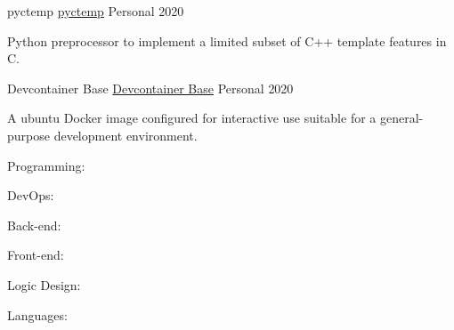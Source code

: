 \documentclass[11pt, a4paper]{cv}
\begin{document}
\begin{cv}
\begin{projects}
\begin{cventries}
{{pyctemp}
{\color{hrefblue}\href{https://github.com/brandonmosher/pyctemp}{pyctemp}}}
{}
{Personal}
{2020}
{\begin{cvparagraph}
Python preprocessor to implement a limited subset of C++ template features in C.
\end{cvparagraph}}
\cventrycompact
{
{Devcontainer Base}
{\color{hrefblue}\href{https://github.com/brandonmosher/devcontainer-base}{Devcontainer Base}}}
{}
{Personal}
{2020}
{\begin{cvparagraph}
A ubuntu Docker image configured for interactive use suitable for a general-purpose development environment.
\end{cvparagraph}}
\end{cventries}
\end{projects}
\begin{skillsets}
\begin{cventries}
\cvskillset
{Programming:}
{\begin{skills}
%
%
%
%
%
%
%
%
%
\end{skills}}
\par
\cvskillset
{DevOps:}
{\begin{skills}
%
%
%
%
%
\end{skills}}
\par
\cvskillset
{Back-end:}
{\begin{skills}
%
%
\end{skills}}
\par
\cvskillset
{Front-end:}
{\begin{skills}
%
%
%
\end{skills}}
\par
\cvskillset
{Logic Design:}
{\begin{skills}
%
%
%
\end{skills}}
\par
\cvskillset
{Languages:}
{\begin{skills}
%
\end{skills}}
\par
\end{cventries}

\end{skillsets}
\end{cv}
\end{document}
